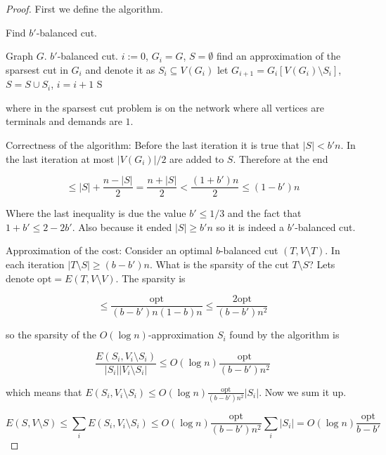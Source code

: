 \begin{proof}
	First we define the algorithm.
	
	\begin{algorithm}
		\caption{Find $b'$-balanced cut.}
		\begin{algorithmic}[1]
			\Require Graph $G$.
			\Ensure $b'$-balanced cut.
			\State $i := 0$, $G_{i} = G$, $S = \emptyset$
			\State find an approximation of the sparsest cut in $G_{i}$ and denote it as $S_{i} \subseteq V(G_{i})$
			\State let $G_{i+1} = G_{i}[V(G_{i}) \setminus S_{i}]$, $S = S \cup S_{i}$, $i = i+1$
			\EndWhile
			\State \Return S
		\end{algorithmic}
	\end{algorithm}
	
	where in the sparsest cut problem is on the network where all vertices are terminals and demands are $1$.
	
	Correctness of the algorithm: Before the last iteration it is true that $|S| < b'n$. In the last iteration at most $|V(G_{i})| / 2$ are added to $S$. Therefore at the end
	
	$$
	\leq |S| + \frac{n - |S|}{2} = \frac{n + |S|}{2} < \frac{(1+ b')n}{2} \leq (1- b')n
	$$
	
	Where the last inequality is due the value $b' \leq 1/3$ and the fact that $1+b' \leq 2-2b'$. Also because it ended $|S| \geq b'n$ so it is indeed a $b'$-balanced cut.
	
	Approximation of the cost:	Consider an optimal $b$-balanced cut $(T, V \setminus T)$. In each iteration $|T \setminus S| \geq (b - b') n$. What is the sparsity of the cut $T \setminus S$? Lets denote $\text{opt} = E(T, V \setminus V)$. The sparsity is
	
	$$
	\leq \frac{\text{opt}}{(b - b')n(1-b)n} \leq \frac{2 \text{opt}}{(b-b')n^{2}}
	$$
	
	so the sparsity of the $O(\log n)$-approximation $S_{i}$ found by the algorithm is
	
	$$
	\frac{E(S_{i}, V_{i} \setminus S_{i})}{|S_{i}| |V_{i} \setminus S_{i}|} \leq O(\log n) \frac{\text{opt}}{(b-b')n^{2}}
	$$
	
	which means that $E(S_{i}, V_{i} \setminus S_{i}) \leq O(\log n) \frac{\text{opt}}{(b-b')n^{2}} |S_{i}|$. Now we sum it up.
	
	$$
	E(S, V \setminus S) \leq \sum_{i} E(S_{i}, V_{i} \setminus S_{i}) \leq O(\log n) \frac{\text{opt}}{(b-b')n^{2}} \sum_{i} |S_{i}| = O(\log n) \frac{\text{opt}}{b - b'}
	$$
\end{proof}


